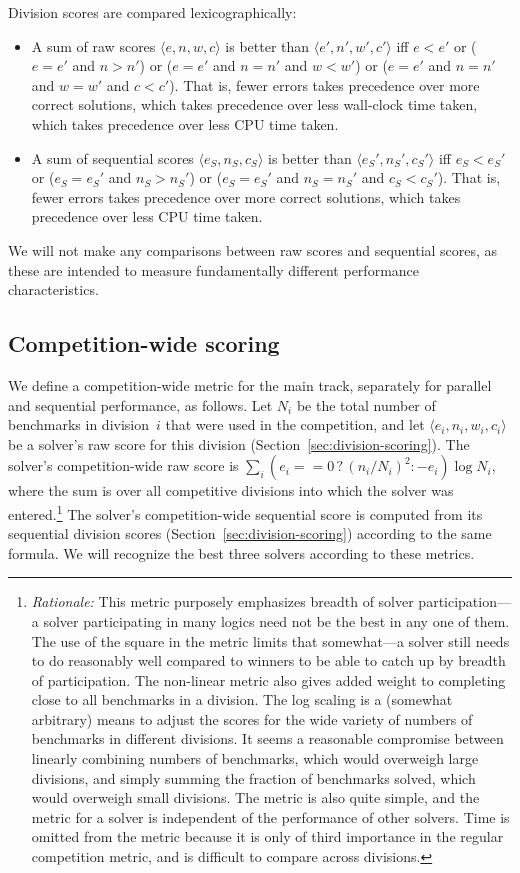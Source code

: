 \documentclass[12pt]{article}
\begin{document}
Division scores are compared lexicographically:
\begin{itemize}
\item A sum of raw scores $\langle e, n, w, c\rangle$ is better than
  $\langle e', n', w', c'\rangle$ iff $e < e'$ or ($e = e'$ and $n >
  n'$) or ($e = e'$ and $n = n'$ and $w < w'$) or ($e = e'$ and $n =
  n'$ and $w = w'$ and $c < c'$).  That is, fewer errors takes
  precedence over more correct solutions, which takes precedence over
  less wall-clock time taken, which takes precedence over less CPU
  time taken.
\item A sum of sequential scores $\langle e_S, n_S, c_S\rangle$ is
  better than $\langle e_S', n_S', c_S'\rangle$ iff $e_S < e_S'$ or
  ($e_S = e_S'$ and $n_S > n_S'$) or ($e_S = e_S'$ and $n_S = n_S'$
  and $c_S < c_S'$).  That is, fewer errors takes precedence over more
  correct solutions, which takes precedence over less CPU time taken.
\end{itemize}
%
We will not make any comparisons between raw scores and sequential
scores, as these are intended to measure fundamentally different
performance characteristics.

\subsection{Competition-wide scoring}

We define a competition-wide metric for the main track, separately for
parallel and sequential performance, as follows.  Let $N_i$ be the
total number of benchmarks in division~$i$ that were used in the
competition, and let $\langle e_i, n_i, w_i, c_i\rangle$ be a solver's
raw score for this division (Section~\ref{sec:division-scoring}).  The
solver's competition-wide raw score is $\sum_i (e_i == 0 \,?\,
(n_i/N_i)^2 : -e_i) \log N_i$, where the sum is over all competitive
divisions into which the solver was
entered.\footnote{\emph{Rationale:} This metric purposely emphasizes
  breadth of solver participation---a solver participating in many
  logics need not be the best in any one of them.  The use of the
  square in the metric limits that somewhat---a solver still needs to
  do reasonably well compared to winners to be able to catch up by
  breadth of participation.  The non-linear metric also gives added
  weight to completing close to all benchmarks in a division.  The log
  scaling is a (somewhat arbitrary) means to adjust the scores for the
  wide variety of numbers of benchmarks in different divisions.  It
  seems a reasonable compromise between linearly combining numbers of
  benchmarks, which would overweigh large divisions, and simply
  summing the fraction of benchmarks solved, which would overweigh
  small divisions.  The metric is also quite simple, and the metric
  for a solver is independent of the performance of other solvers.
  Time is omitted from the metric because it is only of third
  importance in the regular competition metric, and is difficult to
  compare across divisions.}  The solver's competition-wide sequential
score is computed from its sequential division scores
(Section~\ref{sec:division-scoring}) according to the same formula.
We will recognize the best three solvers according to these metrics.
\end{document}
